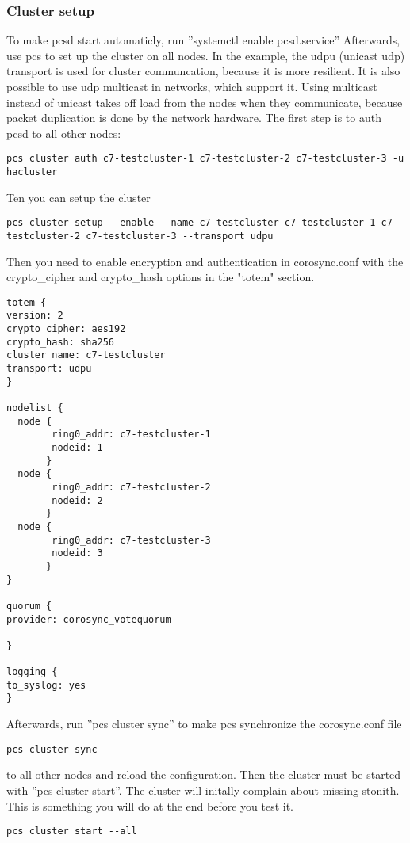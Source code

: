 \subsubsection{Cluster setup}
To make pcsd start automaticly, run ''systemctl enable pcsd.service''
Afterwards, use pcs to set up the cluster on all nodes. 
In the example, the udpu (unicast udp) transport is used for cluster communcation, because it is more resilient.
It is also possible to use udp multicast in networks, which support it. Using multicast
instead of unicast takes off load from the nodes when they communicate, because packet duplication is done by the network hardware.
The first step is to auth pcsd to all other nodes:
\begin{lstlisting}
pcs cluster auth c7-testcluster-1 c7-testcluster-2 c7-testcluster-3 -u hacluster
\end{lstlisting}
Ten you can setup the cluster
\begin{lstlisting}
pcs cluster setup --enable --name c7-testcluster c7-testcluster-1 c7-testcluster-2 c7-testcluster-3 --transport udpu
\end{lstlisting}
Then you need to enable encryption and authentication in corosync.conf with the crypto\_cipher and crypto\_hash
options in the "totem" section.
\begin{lstlisting}
totem {
version: 2
crypto_cipher: aes192
crypto_hash: sha256
cluster_name: c7-testcluster
transport: udpu
}

nodelist {
  node {
        ring0_addr: c7-testcluster-1
        nodeid: 1
       }
  node {
        ring0_addr: c7-testcluster-2
        nodeid: 2
       }
  node {
        ring0_addr: c7-testcluster-3
        nodeid: 3
       }
}

quorum {
provider: corosync_votequorum

}

logging {
to_syslog: yes
}
\end{lstlisting}
Afterwards, run ''pcs cluster sync'' to make pcs synchronize the corosync.conf file
\begin{lstlisting}
pcs cluster sync
\end{lstlisting}
to all other nodes and reload the configuration.
Then the cluster must be started with ''pcs cluster start''.
The cluster will initally complain about missing stonith. This is something you will do at the end
before you test it.
\begin{lstlisting}
pcs cluster start --all
\end{lstlisting}
